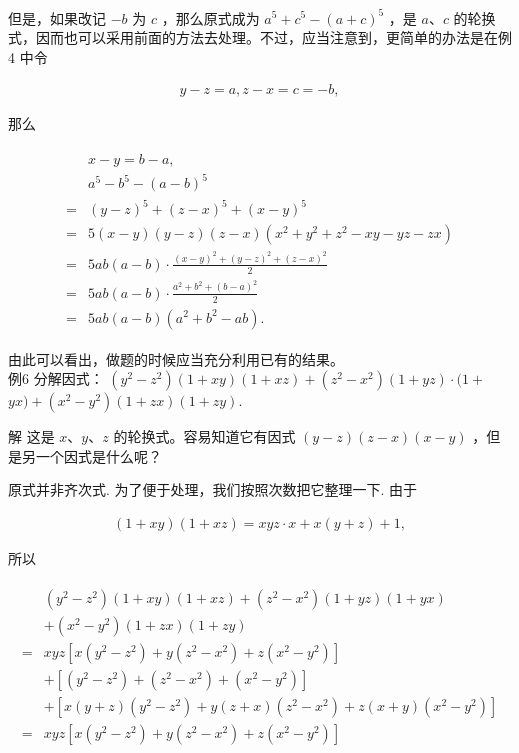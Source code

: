 \documentclass[10pt]{article}
\begin{document}
但是，如果改记 $-b$ 为 $c$ ，那么原式成为 $a^{5}+c^{5}-(a+c)^{5}$ ，是 $a 、 c$ 的轮换式，因而也可以采用前面的方法去处理。不过，应当注意到，更简单的办法是在例 4 中令

\begin{align*}
y-z=a, z-x=c=-b,
\end{align*}

那么

\begin{align*}
\begin{aligned}
& x-y=b-a, \\
& a^{5}-b^{5}-(a-b)^{5} \\
= & (y-z)^{5}+(z-x)^{5}+(x-y)^{5} \\
= & 5(x-y)(y-z)(z-x)\left(x^{2}+y^{2}+z^{2}-x y-y z-z x\right) \\
= & 5 a b(a-b) \cdot \frac{(x-y)^{2}+(y-z)^{2}+(z-x)^{2}}{2} \\
= & 5 a b(a-b) \cdot \frac{a^{2}+b^{2}+(b-a)^{2}}{2} \\
= & 5 a b(a-b)\left(a^{2}+b^{2}-a b\right) .
\end{aligned}
\end{align*}

由此可以看出，做题的时候应当充分利用已有的结果。\\
例6 分解因式： $\left(y^{2}-z^{2}\right)(1+x y)(1+x z)+\left(z^{2}-x^{2}\right)(1+y z) \cdot(1+$ $y x)+\left(x^{2}-y^{2}\right)(1+z x)(1+z y)$.

解 这是 $x 、 y 、 z$ 的轮换式。容易知道它有因式 $(y-z)(z-x)(x-y)$ ，但是另一个因式是什么呢？

原式并非齐次式. 为了便于处理，我们按照次数把它整理一下. 由于

\begin{align*}
(1+x y)(1+x z)=x y z \cdot x+x(y+z)+1,
\end{align*}

所以

\begin{align*}
\begin{aligned}
& \left(y^{2}-z^{2}\right)(1+x y)(1+x z)+\left(z^{2}-x^{2}\right)(1+y z)(1+y x) \\
& +\left(x^{2}-y^{2}\right)(1+z x)(1+z y) \\
= & x y z\left[x\left(y^{2}-z^{2}\right)+y\left(z^{2}-x^{2}\right)+z\left(x^{2}-y^{2}\right)\right] \\
& +\left[\left(y^{2}-z^{2}\right)+\left(z^{2}-x^{2}\right)+\left(x^{2}-y^{2}\right)\right] \\
& +\left[x(y+z)\left(y^{2}-z^{2}\right)+y(z+x)\left(z^{2}-x^{2}\right)+z(x+y)\left(x^{2}-y^{2}\right)\right] \\
= & x y z\left[x\left(y^{2}-z^{2}\right)+y\left(z^{2}-x^{2}\right)+z\left(x^{2}-y^{2}\right)\right]
\end{aligned}
\end{align*}
\end{document}
